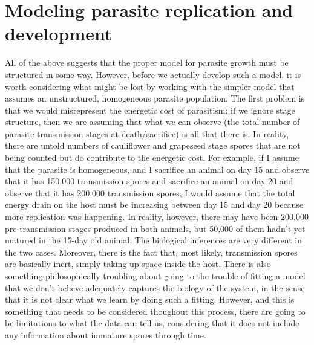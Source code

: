 \documentclass[12pt,reqno,final,pdftex]{amsart}\usepackage[]{graphicx}\usepackage[]{color}
\theoremstyle{plain}
\numberwithin{equation}{part}
\begin{document}
\section*{Modeling parasite replication and development}
All of the above suggests that the proper model for parasite growth must be structured in some way.
However, before we actually develop such a model, it is worth considering what might be lost by working with the simpler model that assumes an unstructured, homogeneous parasite population.
The first problem is that we would misrepresent the energetic cost of parasitism: if we ignore stage structure, then we are assuming that what we can observe (the total number of parasite transmission stages at death/sacrifice) is all that there is.
In reality, there are untold numbers of cauliflower and grapeseed stage spores that are not being counted but do contribute to the energetic cost.
For example, if I assume that the parasite is homogeneous, and I sacrifice an animal on day 15 and observe that it has 150,000 transmission spores and sacrifice an animal on day 20 and observe that it has 200,000 transmission spores, I would assume that the total energy drain on the host must be increasing between day 15 and day 20 because more replication was happening.
In reality, however, there may have been 200,000 pre-transmission stages produced in both animals, but 50,000 of them hadn't yet matured in the 15-day old animal.
The biological inferences are very different in the two cases.
Moreover, there is the fact that, most likely, transmission spores are basically inert, simply taking up space inside the host.
There is also something philosophically troubling about going to the trouble of fitting a model that we don't believe adequately captures the biology of the system, in the sense that it is not clear what we learn by doing such a fitting.
However, and this is something that needs to be considered thoughout this process, there are going to be limitations to what the data can tell us, considering that it does not include any information about immature spores through time.
\end{document}
